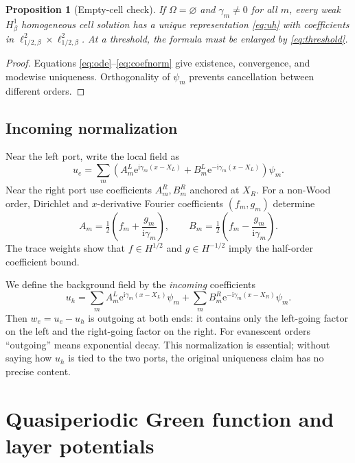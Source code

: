 \documentclass[11pt]{article}
\newcommand{\Om}{\Omega}
\newcommand{\ii}{\mathrm i}
\newcommand{\ee}{\mathrm e}
\theoremstyle{plain}
\newtheorem{proposition}[theorem]{Proposition}
\theoremstyle{definition}
\theoremstyle{remark}
\begin{document}
\begin{proposition}[Empty-cell check]
\label{prop:empty}
If \(\Om=\varnothing\) and \(\gamma_m\neq0\) for all \(m\), every weak
\(H^1_\beta\) homogeneous cell solution has a unique representation
\eqref{eq:uh} with coefficients in
\(\ell^2_{1/2,\beta}\times\ell^2_{1/2,\beta}\).  At a threshold, the formula
must be enlarged by \eqref{eq:threshold}.
\end{proposition}

\begin{proof}
Equations \eqref{eq:ode}--\eqref{eq:coefnorm} give existence, convergence, and
modewise uniqueness.  Orthogonality of \(\psi_m\) prevents cancellation
between different orders.
\end{proof}

\subsection{Incoming normalization}

Near the left port, write the local field as
\[
u_e=\sum_m(A_m^L\ee^{\ii\gamma_m(x-X_L)}
+B_m^L\ee^{-\ii\gamma_m(x-X_L)})\psi_m.
\]
Near the right port use coefficients \(A_m^R,B_m^R\) anchored at \(X_R\).
For a non-Wood order, Dirichlet and \(x\)-derivative Fourier coefficients
\((f_m,g_m)\) determine
\begin{equation}
A_m=\tfrac12\left(f_m+\frac{g_m}{\ii\gamma_m}\right),\qquad
B_m=\tfrac12\left(f_m-\frac{g_m}{\ii\gamma_m}\right).
\label{eq:portcoeff}
\end{equation}
The trace weights show that \(f\in H^{1/2}\) and \(g\in H^{-1/2}\) imply the
half-order coefficient bound.

We define the background field by the \emph{incoming} coefficients
\begin{equation}
u_h=\sum_m A_m^L\ee^{\ii\gamma_m(x-X_L)}\psi_m
+\sum_m B_m^R\ee^{-\ii\gamma_m(x-X_R)}\psi_m.
\label{eq:incomingh}
\end{equation}
Then \(w_e=u_e-u_h\) is outgoing at both ends: it contains only the left-going
factor on the left and the right-going factor on the right.  For evanescent
orders ``outgoing'' means exponential decay.  This normalization is essential;
without saying how \(u_h\) is tied to the two ports, the original uniqueness
claim has no precise content.

\section{Quasiperiodic Green function and layer potentials}
\label{sec:layers}
\end{document}
